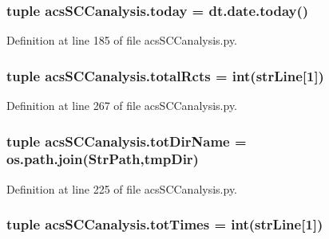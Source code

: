 \hypertarget{a00097_a5498b0a6851ae4d3b2c3035093564e47}{
\subsubsection[{today}]{\setlength{\rightskip}{0pt plus 5cm}tuple acs\-S\-C\-Canalysis.\-today = dt.\-date.\-today()}}\label{a00097_a5498b0a6851ae4d3b2c3035093564e47}


Definition at line 185 of file acs\-S\-C\-Canalysis.\-py.

\hypertarget{a00097_a9f0e87ff21f3597668f5ad076224da87}{
\subsubsection[{total\-Rcts}]{\setlength{\rightskip}{0pt plus 5cm}tuple acs\-S\-C\-Canalysis.\-total\-Rcts = int({\bf str\-Line}\mbox{[}1\mbox{]})}}\label{a00097_a9f0e87ff21f3597668f5ad076224da87}


Definition at line 267 of file acs\-S\-C\-Canalysis.\-py.

\hypertarget{a00097_a5903034df3d32525785e697152efbeb3}{
\subsubsection[{tot\-Dir\-Name}]{\setlength{\rightskip}{0pt plus 5cm}tuple acs\-S\-C\-Canalysis.\-tot\-Dir\-Name = os.\-path.\-join({\bf Str\-Path},tmp\-Dir)}}\label{a00097_a5903034df3d32525785e697152efbeb3}


Definition at line 225 of file acs\-S\-C\-Canalysis.\-py.

\hypertarget{a00097_a20df40e09bc9514382d71f15783c7856}{
\subsubsection[{tot\-Times}]{\setlength{\rightskip}{0pt plus 5cm}tuple acs\-S\-C\-Canalysis.\-tot\-Times = int({\bf str\-Line}\mbox{[}1\mbox{]})}}\label{a00097_a20df40e09bc9514382d71f15783c7856}


